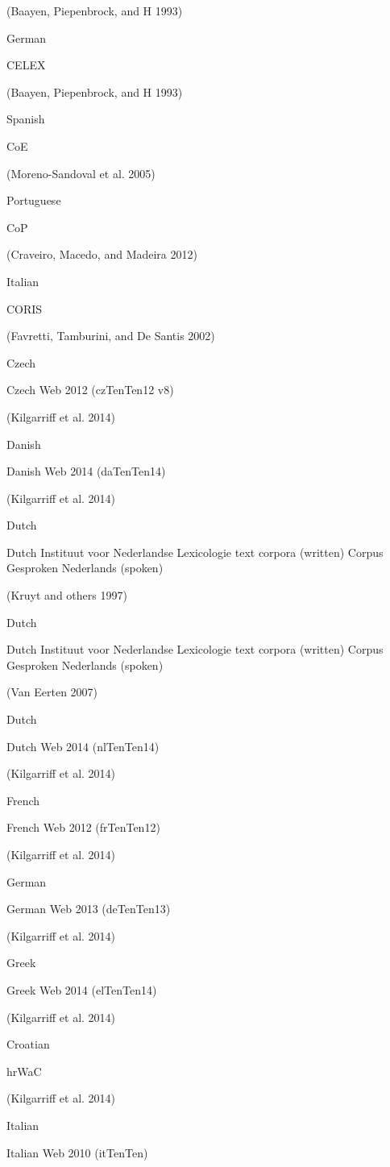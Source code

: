 \documentclass[]{article}
\begin{document}
(Baayen, Piepenbrock, and H 1993)

German

CELEX

(Baayen, Piepenbrock, and H 1993)

Spanish

CoE

(Moreno-Sandoval et al. 2005)

Portuguese

CoP

(Craveiro, Macedo, and Madeira 2012)

Italian

CORIS

(Favretti, Tamburini, and De Santis 2002)

Czech

Czech Web 2012 (czTenTen12 v8)

(Kilgarriff et al. 2014)

Danish

Danish Web 2014 (daTenTen14)

(Kilgarriff et al. 2014)

Dutch

Dutch Instituut voor Nederlandse Lexicologie text corpora (written)
Corpus Gesproken Nederlands (spoken)

(Kruyt and others 1997)

Dutch

Dutch Instituut voor Nederlandse Lexicologie text corpora (written)
Corpus Gesproken Nederlands (spoken)

(Van Eerten 2007)

Dutch

Dutch Web 2014 (nlTenTen14)

(Kilgarriff et al. 2014)

French

French Web 2012 (frTenTen12)

(Kilgarriff et al. 2014)

German

German Web 2013 (deTenTen13)

(Kilgarriff et al. 2014)

Greek

Greek Web 2014 (elTenTen14)

(Kilgarriff et al. 2014)

Croatian

hrWaC

(Kilgarriff et al. 2014)

Italian

Italian Web 2010 (itTenTen)
\end{document}
